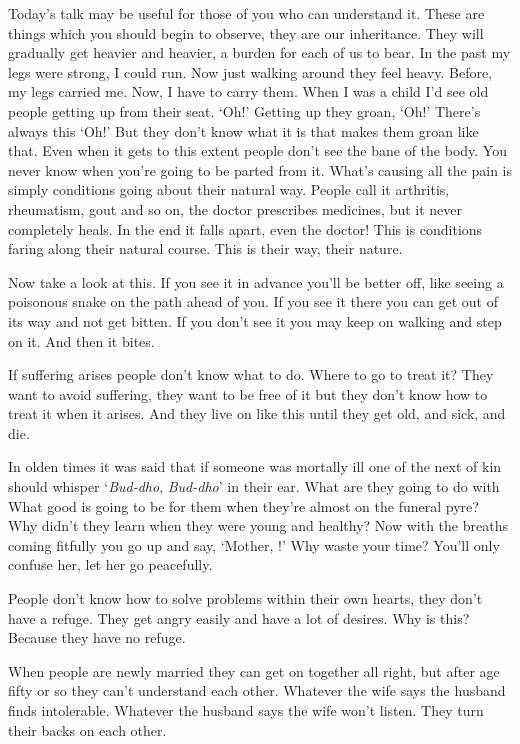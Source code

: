 Today's talk may be useful for those of you who can understand it. These are things which you should begin to observe, they are our inheritance. They will gradually get heavier and heavier, a burden for each of us to bear. In the past my legs were strong, I could run. Now just walking around they feel heavy. Before, my legs carried me. Now, I have to carry them. When I was a child I'd see old people getting up from their seat. `Oh!' Getting up they groan, `Oh!' There's always this `Oh!' But they don't know what it is that makes them groan like that. Even when it gets to this extent people don't see the bane of the body. You never know when you're going to be parted from it. What's causing all the pain is simply conditions going about their natural way. People call it arthritis, rheumatism, gout and so on, the doctor prescribes medicines, but it never completely heals. In the end it falls apart, even the doctor! This is conditions faring along their natural course. This is their way, their nature.

Now take a look at this. If you see it in advance you'll be better off, like seeing a poisonous snake on the path ahead of you. If you see it there you can get out of its way and not get bitten. If you don't see it you may keep on walking and step on it. And then it bites.

If suffering arises people don't know what to do. Where to go to treat it? They want to avoid suffering, they want to be free of it but they don't know how to treat it when it arises. And they live on like this until they get old, and sick, and die.

In olden times it was said that if someone was mortally ill one of the next of kin should whisper `\textit{Bud-dho}, \textit{Bud-dho}' in their ear. What are they going to do with  What good is  going to be for them when they're almost on the funeral pyre? Why didn't they learn  when they were young and healthy? Now with the breaths coming fitfully you go up and say, `Mother, !' Why waste your time? You'll only confuse her, let her go peacefully.

People don't know how to solve problems within their own hearts, they don't have a refuge. They get angry easily and have a lot of desires. Why is this? Because they have no refuge.

When people are newly married they can get on together all right, but after age fifty or so they can't understand each other. Whatever the wife says the husband finds intolerable. Whatever the husband says the wife won't listen. They turn their backs on each other.

